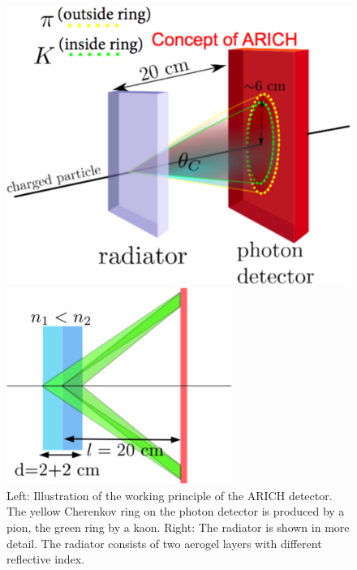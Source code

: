 \documentclass[a4paper,11pt,twosided,final,german,openbib,pdftex,listof=totoc,bibliography=totoc]{scrbook}
\begin{document}
\begin{figure}[h!]
	\centering
\begin{minipage}[b]{0.45\linewidth}
	\centering
	\includegraphics[width=\textwidth]{Bilder/ARICH}
\end{minipage}
\hspace{0.5cm}
\begin{minipage}[b]{0.45\linewidth}
	\centering
	\includegraphics[width=\textwidth]{Bilder/ARICH2}
\end{minipage}

	\caption[ARICH]{Left: Illustration of the working principle of the ARICH detector. The yellow Cherenkov ring on the photon detector is produced by a pion, the green ring by a kaon. Right: The radiator is shown in more detail. The radiator consists of two aerogel layers with different reflective index. \cite{TORASSA} }
\label{fig:ARICH}
\end{figure}
\end{document}
